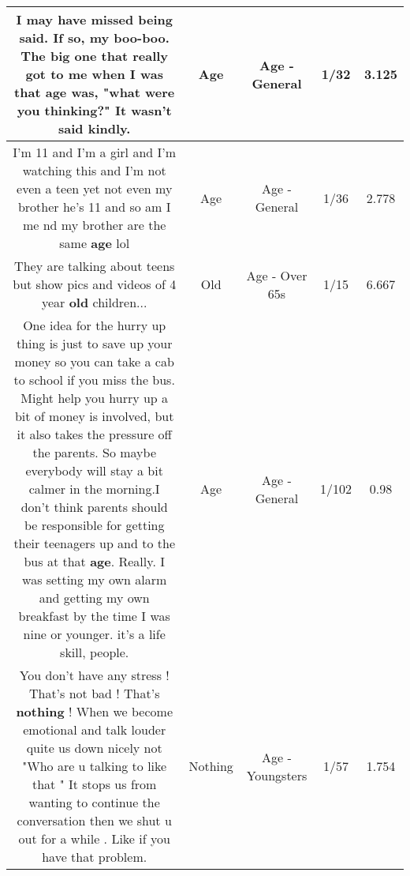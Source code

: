 \documentclass[11pt]{article}
\newlength\mylength
\begin{document}
\begin{center}
\begin{longtable}{|C{.65\mylength}|C{.30\mylength}|C{.12\mylength}|C{.12\mylength}|C{.12\mylength}|}
  \small I may have missed being said.  If so, my boo-boo.  The big one that really got to me when I was that \textbf{age} was, "what were you thinking?"  It wasn't said kindly.\normalsize   & Age & Age - General & 1/32 & 3.125 \\  \hline
  \small I'm 11 and I'm a girl and I'm watching this and I'm not even a teen yet not even my brother he's 11 and so am I me nd my brother are the same \textbf{age} lol\normalsize   & Age & Age - General & 1/36 & 2.778 \\  \hline
  \small They are talking about teens but show pics and videos of 4 year \textbf{old} children...\normalsize   & Old & Age - Over 65s & 1/15 & 6.667 \\  \hline
  \small One idea for the hurry up thing is just to save up your money so you can take a cab to school if you miss the bus. Might help you hurry up a bit of money is involved, but it also takes the pressure off the parents. So maybe everybody will stay a bit calmer in the morning.I don't think parents should be responsible for getting their teenagers up and to the bus at that \textbf{age}. Really. I was setting my own alarm and getting my own breakfast by the time I was nine or younger. it's a life skill, people.\normalsize   & Age & Age - General & 1/102 & 0.98 \\  \hline
  \small You don't have any stress ! That's not bad ! That's \textbf{nothing} ! When we become emotional and talk louder quite us down nicely not "Who are u talking to like that " It stops us from wanting to continue the conversation then we shut u out for a while . Like if you have that problem.\normalsize   & Nothing & Age - Youngsters & 1/57 & 1.754 \\  \hline

\end{longtable}
\end{center}
\end{document}

